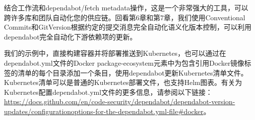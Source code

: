 结合工作流和dependabot/fetch metadata操作，这是一个非常强大的工具，可以跨许多库和团队自动化您的供应链。回看第6章和第7章，我们使用Conventional Commits和GitVersion根据约定的提交消息完全自动化语义化版本控制，可以利用dependabot完全自动化下游依赖项的更新。


我们的示例中，直接构建容器并将部署推送到Kubernetes，也可以通过在dependabot.yml文件的Docker package-ecosystem元素中为包含引用Docker镜像标签的清单的每个目录添加一个条目，使用dependabot更新Kubernetes清单文件。Kubernetes清单可以是普通的Kubernetes部署文件，也支持Helm图表。有关为Kubernetes配置dependabot.yml文件的更多信息，请参阅以下链接：\url{https://docs.github.com/en/code-security/dependabot/dependabot-version-updates/configurationoptions-for-the-dependabot.yml-file#docker}。